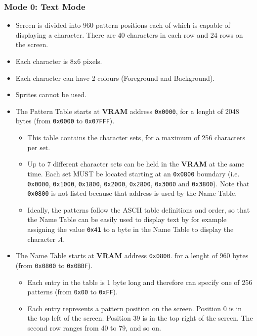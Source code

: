         \subsubsection{Mode 0: \textbf{Text Mode}}
        \begin{itemize}
            \item Screen is divided into 960 pattern positions each of which is
                capable of displaying a character. There are 40 characters in
                each row and 24 rows on the screen.
            \item Each character is 8x6 pixels.
            \item Each character can have 2 colours (Foreground and Background).
            \item Sprites cannot be used.
            \item The Pattern Table starts at \textbf{VRAM} address
                \texttt{0x0000}, for a lenght of 2048 bytes (from
                \texttt{0x0000} to \texttt{0x07FFF}).
            \begin{itemize}
                \item This table contains the character sets, for a maximum of
                    256 characters per set.
                \item Up to 7 different character sets can be held in the
                    \textbf{VRAM} at the same time. Each set MUST be located
                    starting at an \texttt{0x0800} boundary (i.e. 
                    \texttt{0x0000}, \texttt{0x1000}, \texttt{0x1800},
                    \texttt{0x2000}, \texttt{0x2800}, \texttt{0x3000} and
                    \texttt{0x3800}). Note that \texttt{0x0800} is not listed
                    because that address is used by the Name Table.
                \item Ideally, the patterns follow the ASCII table definitions
                    and order, so that the Name Table can be easily used to
                    display text by for example assigning the value \texttt{0x41}
                    to a byte in the Name Table to display the character
                    \textit{A}.
            \end{itemize}
            \item The Name Table starts at \textbf{VRAM} address \texttt{0x0800}.
                for a lenght of 960 bytes (from \texttt{0x0800} to
                \texttt{0x0BBF}).
            \begin{itemize}
                \item Each entry in the table is 1 byte long and therefore can
                    specify one of 256 patterns (from \texttt{0x00} to
                    \texttt{0xFF}).
                \item Each entry represents a pattern position on the screen.
                    Position 0 is in the top left of the screen. Position 39 is
                    in the top right of the screen. The second row ranges from
                    40 to 79, and so on.
            \end{itemize}
        \end{itemize}

